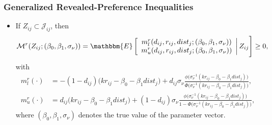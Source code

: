 \documentclass[10pt,letterpaper]{beamer}
\begin{document}
\begin{frame}[label=revpref]
\frametitle{Generalized Revealed-Preference Inequalities}

\begin{itemize}
	\item If $Z_{ij}\subset\mathcal{J}_{ij}$, then
	\footnotesize
	\begin{align*}
	\mathcal{M}^{r}(Z_{ij};(\beta_{0},\beta_{1},\sigma_{\nu}))=\mathbbm{E}
	\left[
	\begin{array}{c}
	m^{r}_{l}(d_{ij},r_{ij},dist_{j};(\beta_{0},\beta_{1},\sigma_{\nu}))\\
	m^{r}_{u}(d_{ij},r_{ij},dist_{j};(\beta_{0},\beta_{1},\sigma_{\nu}))\\
	\end{array}\right|
	Z_{ij}
	\Bigg]\geq0,
	\end{align*}
	with
	\begin{align*}
	m^{r}_{l}(\cdot)&=-(1-d_{ij})\big(kr_{ij}-\beta_{0}-\beta_{1}dist_{j}\big)+d_{ij}\sigma_{\nu}\frac{\phi\big(\sigma_{\nu}^{-1}(kr_{ij}-\beta_{0}-\beta_{1}dist_{j})\big)}{\Phi\big(\sigma_{\nu}^{-1}(kr_{ij}-\beta_{0}-\beta_{1}dist_{j})\big)},\\
	m^{r}_{u}(\cdot)&=d_{ij}\big(kr_{ij}-\beta_{0}-\beta_{1}dist_{j}\big)+(1-d_{ij})\sigma_{\nu}\frac{\phi\big(\sigma_{\nu}^{-1}(kr_{ij}-\beta_{0}-\beta_{1}dist_{j})\big)}{1-\Phi\big(\sigma_{\nu}^{-1}(kr_{ij}-\beta_{0}-\beta_{1}dist_{j})\big)},
	\end{align*}
	\normalsize
	where $(\beta_{0},\beta_{1},\sigma_{\nu})$ denotes the true value of the parameter vector.
\end{itemize}
\end{frame}
\end{document}
